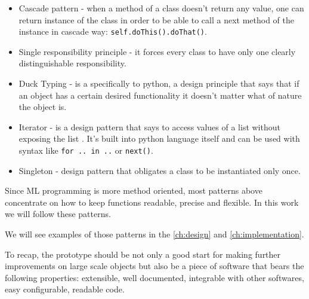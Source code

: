 \begin{itemize}
	\item Cascade pattern - when a method of a class doesn't return any value,
		one can return instance of the class in order to be able to call a
		next method of the instance in cascade way: \lstinline{self.doThis().doThat()}.\cite{beck1997smalltalk}
	\item Single responsibility principle - it forces every class to have only one
		clearly distinguishable responsibility.\cite{martin2003agile}
	\item Duck Typing - is a specifically to python, a design principle that
		says that if an object has a certain desired functionality it doesn't matter
		what of nature the object is.
	\item Iterator - is a design pattern that says to access values of a list
	 	without exposing the list \cite{Gamma:1995:DPE:186897}. It's built into python language itself and
		can be used with syntax like \lstinline{for .. in ..} or \lstinline{next()}.
	\item Singleton - design pattern that obligates a class to be
		instantiated only once. \cite{Eckel2017}
\end{itemize}

Since ML programming is more method oriented, most patterns above concentrate
on how to keep functions readable, precise and flexible. In this work we will follow
these patterns.

We will see examples of those patterns in the \autoref{ch:design}
and \autoref{ch:implementation}.

To recap, the prototype should be not only a good start for making further
improvements on large scale objects but also be a piece of software that bears the
following properties: extensible, well documented, integrable with other
softwares, easy configurable, readable code.


